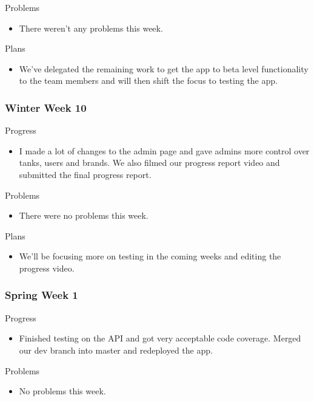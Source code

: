         \noindent
        Problems
        \begin{itemize}
            \item There weren't any problems this week.
        \end{itemize}
        
        \noindent
        Plans
        \begin{itemize}
            \item We've delegated the remaining work to get the app to beta level functionality to the team members and will then shift the focus to testing the app.
        \end{itemize}
    \subsubsection{Winter Week 10}
        \noindent
        Progress
        \begin{itemize}
            \item I made a lot of changes to the admin page and gave admins more control over tanks, users and brands. We also filmed our progress report video and submitted the final progress report.
        \end{itemize}
        
        \noindent
        Problems
        \begin{itemize}
            \item There were no problems this week.
        \end{itemize}
        
        \noindent
        Plans
        \begin{itemize}
            \item We'll be focusing more on testing in the coming weeks and editing the progress video.
        \end{itemize}
    \subsubsection{Spring Week 1}
        \noindent
        Progress
        \begin{itemize}
            \item Finished testing on the API and got very acceptable code coverage. Merged our dev branch into master and redeployed the app.
        \end{itemize}
        
        \noindent
        Problems
        \begin{itemize}
            \item No problems this week.
        \end{itemize}
        

